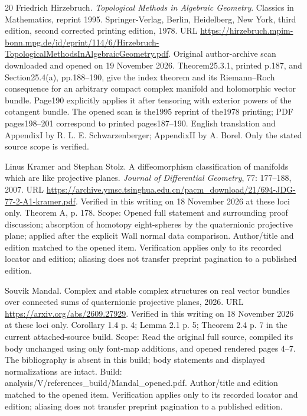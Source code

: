 \documentclass[11pt,a4paper]{article}
\theoremstyle{definition}
\begin{document}
\begin{thebibliography}{20}
Friedrich Hirzebruch.
\newblock \emph{Topological Methods in Algebraic Geometry}.
\newblock Classics in Mathematics, reprint 1995. Springer-Verlag, Berlin,
  Heidelberg, New York, third edition, second corrected printing edition, 1978.
\newblock URL
  \url{https://hirzebruch.mpim-bonn.mpg.de/id/eprint/114/6/Hirzebruch-TopologicalMethodsInAlgebraicGeometry.pdf}.
\newblock Original author-archive scan downloaded and opened on 19 November
  2026. Theorem25.3.1, printed p.187, and Section25.4(a), pp.188--190, give the
  index theorem and its Riemann--Roch consequence for an arbitrary compact
  complex manifold and holomorphic vector bundle. Page190 explicitly applies it
  after tensoring with exterior powers of the cotangent bundle. The opened scan
  is the1995 reprint of the1978 printing;\allowbreak{} PDF pages198--201 correspond to
  printed pages187--190. English translation and AppendixI by R. L. E.
  Schwarzenberger;\allowbreak{} AppendixII by A. Borel. Only the stated source scope is
  verified.

Linus Kramer and Stephan Stolz.
\newblock A diffeomorphism classification of manifolds which are like
  projective planes.
\newblock \emph{Journal of Differential Geometry}, 77: 177--188, 2007.
\newblock URL
  \url{https://archive.ymsc.tsinghua.edu.cn/pacm_download/21/694-JDG-77-2-A1-kramer.pdf}.
\newblock Verified in this writing on 18 November 2026 at these loci only.
  Theorem A, p. 178. Scope: Opened full statement and surrounding proof
  discussion;\allowbreak{} absorption of homotopy eight-spheres by the quaternionic
  projective plane;\allowbreak{} applied after the explicit Wall normal data comparison.
  Author/title and edition matched to the opened item. Verification applies
  only to its recorded locator and edition;\allowbreak{} aliasing does not transfer preprint
  pagination to a published edition.

Souvik Mandal.
\newblock Complex and stable complex structures on real vector bundles over
  connected sums of quaternionic projective planes, 2026.
\newblock URL \url{https://arxiv.org/abs/2609.27929}.
\newblock Verified in this writing on 18 November 2026 at these loci only.
  Corollary 1.4 p. 4;\allowbreak{} Lemma 2.1 p. 5;\allowbreak{} Theorem 2.4 p. 7 in the current
  attached-source build. Scope: Read the original full source, compiled its
  body unchanged using only font-map additions, and opened rendered pages
  4–7. The bibliography is absent in this build;\allowbreak{} body statements and
  displayed normalizations are intact. Build:
  analysis/V/references\_build/Mandal\_opened.pdf. Author/title and edition
  matched to the opened item. Verification applies only to its recorded locator
  and edition;\allowbreak{} aliasing does not transfer preprint pagination to a published
  edition.


\end{thebibliography}
\end{document}
